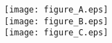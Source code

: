 \documentclass[preview]{standalone}
\begin{document}
\begin{figure}
	\centering
	\texttt{[image: figure\_A.eps]}\\
	\texttt{[image: figure\_B.eps]}\\
	\texttt{[image: figure\_C.eps]}
\end{figure}
\end{document}
